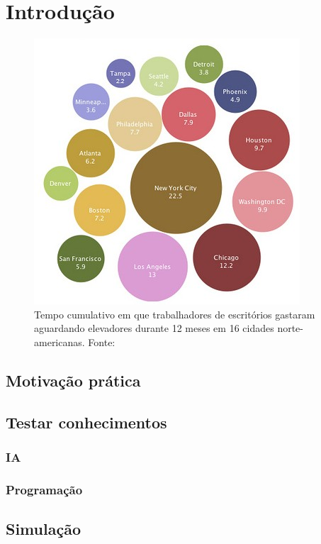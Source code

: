 \chapter{\label{chap:intro}Introdução}

\begin{figure}[htb!]
\centering\includegraphics{img/time-cost.jpg}
\caption{\label{fig:fig1}Tempo cumulativo em que trabalhadores de escritórios gastaram aguardando elevadores durante 12 meses em 16 cidades norte-americanas. Fonte:\cite{HORN10}}
\end{figure}

\cite{MCGAR15}

\section{Motivação prática}
\section{Testar conhecimentos}
\subsection{IA}
\subsection{Programação}
\section{Simulação}